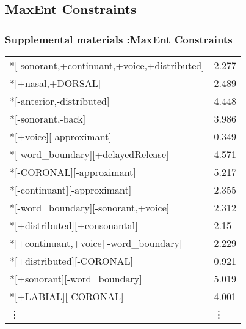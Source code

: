 \documentclass{beamer}
\begin{document}
\subsection{MaxEnt Constraints}
\begin{frame}
\frametitle{Supplemental materials :MaxEnt Constraints}
\begin{table}[]
\begin{tabular}{ll}
*{[}-sonorant,+continuant,+voice,+distributed{]}                  & 2.277 \\
*{[}+nasal,+DORSAL{]}                                             & 2.489 \\
*{[}-anterior,-distributed{]}                                     & 4.448 \\
*{[}-sonorant,-back{]}                                            & 3.986 \\
*{[}+voice{]}{[}-approximant{]}                                   & 0.349 \\
*{[}-word\_boundary{]}{[}+delayedRelease{]}                       & 4.571 \\
*{[}-CORONAL{]}{[}-approximant{]}                                 & 5.217 \\
*{[}-continuant{]}{[}-approximant{]}                              & 2.355 \\
*{[}-word\_boundary{]}{[}-sonorant,+voice{]}                      & 2.312 \\
*{[}+distributed{]}{[}+consonantal{]}                             & 2.15  \\
*{[}+continuant,+voice{]}{[}-word\_boundary{]}                    & 2.229 \\
*{[}+distributed{]}{[}-CORONAL{]}                                 & 0.921 \\
*{[}+sonorant{]}{[}-word\_boundary{]}                             & 5.019 \\
*{[}+LABIAL{]}{[}-CORONAL{]}                                      & 4.001 \\
\vdots & \vdots \\
\end{tabular}
\end{table}
\end{frame}
\end{document}
